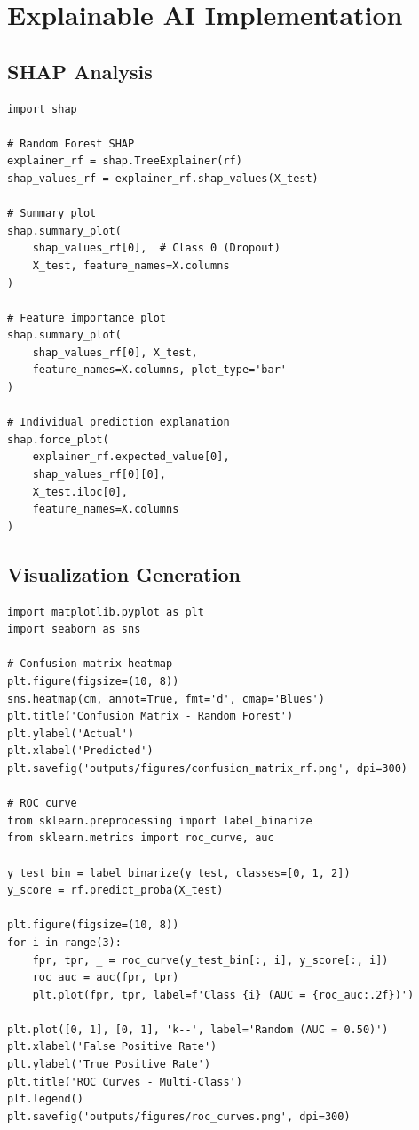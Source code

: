 \section{Explainable AI Implementation}

\subsection{SHAP Analysis}

\begin{verbatim}
import shap

# Random Forest SHAP
explainer_rf = shap.TreeExplainer(rf)
shap_values_rf = explainer_rf.shap_values(X_test)

# Summary plot
shap.summary_plot(
    shap_values_rf[0],  # Class 0 (Dropout)
    X_test, feature_names=X.columns
)

# Feature importance plot
shap.summary_plot(
    shap_values_rf[0], X_test, 
    feature_names=X.columns, plot_type='bar'
)

# Individual prediction explanation
shap.force_plot(
    explainer_rf.expected_value[0],
    shap_values_rf[0][0],
    X_test.iloc[0],
    feature_names=X.columns
)
\end{verbatim}

\subsection{Visualization Generation}

\begin{verbatim}
import matplotlib.pyplot as plt
import seaborn as sns

# Confusion matrix heatmap
plt.figure(figsize=(10, 8))
sns.heatmap(cm, annot=True, fmt='d', cmap='Blues')
plt.title('Confusion Matrix - Random Forest')
plt.ylabel('Actual')
plt.xlabel('Predicted')
plt.savefig('outputs/figures/confusion_matrix_rf.png', dpi=300)

# ROC curve
from sklearn.preprocessing import label_binarize
from sklearn.metrics import roc_curve, auc

y_test_bin = label_binarize(y_test, classes=[0, 1, 2])
y_score = rf.predict_proba(X_test)

plt.figure(figsize=(10, 8))
for i in range(3):
    fpr, tpr, _ = roc_curve(y_test_bin[:, i], y_score[:, i])
    roc_auc = auc(fpr, tpr)
    plt.plot(fpr, tpr, label=f'Class {i} (AUC = {roc_auc:.2f})')

plt.plot([0, 1], [0, 1], 'k--', label='Random (AUC = 0.50)')
plt.xlabel('False Positive Rate')
plt.ylabel('True Positive Rate')
plt.title('ROC Curves - Multi-Class')
plt.legend()
plt.savefig('outputs/figures/roc_curves.png', dpi=300)
\end{verbatim}

